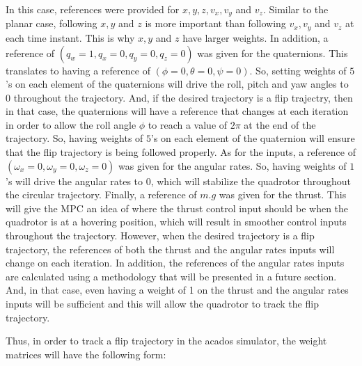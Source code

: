 \documentclass{thesisreport}
\begin{document}
In this case, references were provided for $x,y,z,v_x,v_y$ and $v_z$. Similar to the planar case, following $x,y$ and $z$ is more important than following $v_x,v_y$ and $v_z$ at each time instant. This is why $x,y$ and $z$ have larger weights. In addition, a reference of $(q_w=1,q_x=0,q_y=0,q_z=0)$ was given for the quaternions. This translates to having a reference of $(\phi=0,\theta=0,\psi=0)$. So, setting weights of $5$'s on each element of the quaternions will drive the roll, pitch and yaw angles to 0 throughout the trajectory. And, if the desired trajectory is a flip trajectry, then in that case, the quaternions will have a reference that changes at each iteration in order to allow the roll angle $\phi$ to reach a value of $2\pi$ at the end of the trajectory. So, having weights of $5$'s on each element of the quaternion will ensure that the flip trajectory is being followed properly.
As for the inputs, a reference of $(\omega_x=0, \omega_y=0, \omega_z=0)$ was given for the angular rates. So, having weights of $1$'s will drive the angular rates to 0, which will stabilize the quadrotor throughout the circular trajectory. Finally, a reference of $m.g$ was given for the thrust. This will give the MPC an idea of where the thrust control input should be when the quadrotor is at a hovering position, which will result in smoother control inputs throughout the trajectory. However, when the desired trajectory is a flip trajectory, the references of both the thrust and the angular rates inputs will change on each iteration. In addition, the references of the angular rates inputs are calculated using a methodology that will be presented in a future section. And, in that case, even having a weight of 1 on the thrust and the angular rates inputs will be sufficient and this will allow the quadrotor to track the flip trajectory.

Thus, in order to track a flip trajectory in the acados simulator, the weight matrices will have the following form:
\end{document}
